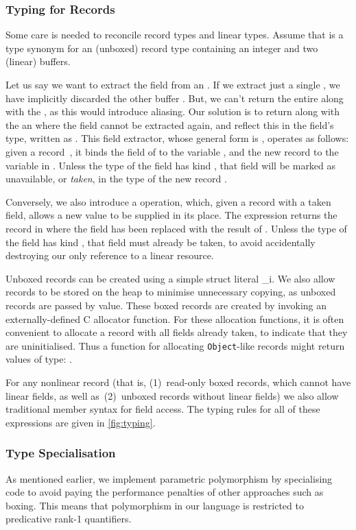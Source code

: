 \documentclass[9pt\ifFinal\else,preprint,nocopyrightspace\fi,\ifAlpha\else natbib,authoryear\fi]{sigplanconf}
\begin{document}
\subsubsection{Typing for Records}
\label{sec:records}




Some care is needed to reconcile record types and linear types.
Assume that  is a type synonym for an (unboxed) record type containing an integer and two (linear) buffers.

Let us say we want to extract the field  from an . If we extract just a single , we have implicitly discarded the other buffer .
But, we can't return the entire  along with the , as this would introduce aliasing. Our solution is to return along with the 
 an  where the field  cannot be extracted again, and reflect this in the field's type, written as . 
This field extractor, whose general form is , operates as follows: given a record~, it binds the field  of  
to the variable
, and the new record to the variable  in . Unless the type of the field  has kind , that field will be marked as unavailable, or \emph{taken}, in the type of the new record .

Conversely, we also introduce a  operation, which, given a record with a taken field, allows a new value to be supplied in its place. The expression  returns the
record in  where the field  has been replaced with the result of . Unless the type of the field  has kind , that field must already be taken, to avoid
accidentally destroying our only reference to a linear resource.

Unboxed records can be created using a simple struct literal _i. We also allow records to be stored on the heap to minimise unnecessary copying,
as unboxed records are passed by value.  These boxed records are created by invoking an externally-defined C allocator function.
For these allocation functions, it is often convenient to allocate a record with all fields already taken, to indicate that they are uninitialised. Thus a function for allocating
\texttt{Object}-like records might return values of type: .

For any nonlinear record (that is, (1)~read-only boxed records, which cannot have linear fields, as well as~(2)~unboxed records without linear fields)
 we also allow traditional member syntax  for field access. The typing rules for all of these expressions are given in \autoref{fig:typing}. 

\subsubsection{Type Specialisation} 
\label{sec:typing:poly}
As mentioned earlier, we implement parametric polymorphism by specialising code to avoid paying the performance penalties of other approaches such as
boxing. This means that polymorphism in our language is restricted to predicative rank-1 quantifiers.
\end{document}
